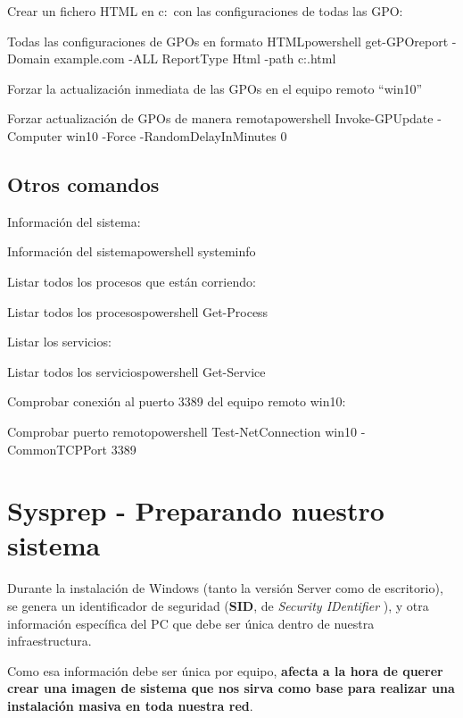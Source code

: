 Crear un fichero HTML en c:\  con las configuraciones de todas las GPO:
\begin{mycode}{Todas las configuraciones de GPOs en formato HTML}{powershell}{}
get-GPOreport -Domain example.com -ALL ReportType Html -path c:\gpo.html
\end{mycode}

\hypertarget{forzar_gpo}{}
Forzar la actualización inmediata de las GPOs en el equipo remoto “win10”
\begin{mycode}{Forzar actualización de GPOs de manera remota}{powershell}{}
Invoke-GPUpdate -Computer win10 -Force -RandomDelayInMinutes 0
\end{mycode}


\section{Otros comandos}
Información del sistema:
\begin{mycode}{Información del sistema}{powershell}{}
systeminfo
\end{mycode}

Listar todos los procesos que están corriendo:
\begin{mycode}{Listar todos los procesos}{powershell}{}
Get-Process
\end{mycode}

Listar los servicios:
\begin{mycode}{Listar todos los servicios}{powershell}{}
Get-Service
\end{mycode}


Comprobar conexión al puerto 3389 del equipo remoto win10:
\begin{mycode}{Comprobar puerto remoto}{powershell}{}
Test-NetConnection win10 -CommonTCPPort 3389
\end{mycode}


\chapter{Sysprep - Preparando nuestro sistema}

Durante la instalación de Windows (tanto la versión Server como de escritorio), se genera un identificador de seguridad (\textbf{SID}, de \textit{Security IDentifier }), y otra información específica del PC que debe ser única dentro de nuestra infraestructura.

Como esa información debe ser única por equipo, \textbf{afecta a la hora de querer crear una imagen de sistema que nos sirva como base para realizar una instalación masiva en toda nuestra red}.

